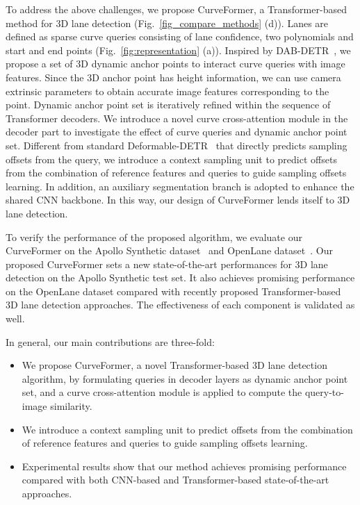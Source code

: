 \documentclass[letterpaper, 10 pt, conference]{ieeeconf}
\begin{document}
To address the above challenges, we propose CurveFormer, a Transformer-based method for 3D lane detection (Fig.~\ref{fig_compare_methods} (d)). Lanes are defined as sparse curve queries consisting of lane confidence, two polynomials and start and end points (Fig.~\ref{fig:representation} (a)). Inspired by DAB-DETR~\cite{liu2022dab}, we propose a set of 3D dynamic anchor points to interact curve queries with image features. Since the 3D anchor point  has height information, we can use camera extrinsic parameters to obtain accurate image features corresponding to the point. Dynamic anchor point set is iteratively refined within the sequence of Transformer decoders. We introduce a novel curve cross-attention module in the decoder part to investigate the effect of curve queries and dynamic anchor point set. Different from standard Deformable-DETR~\cite{zhu2020deformable } that directly predicts sampling offsets from the query, we introduce a context sampling unit to predict offsets from the combination of reference features and queries to guide sampling offsets learning. 
In addition, an auxiliary segmentation branch is adopted to enhance the shared CNN backbone. In this way, our design of CurveFormer lends itself to 3D lane detection.

To verify the performance of the proposed algorithm, we evaluate our CurveFormer on the Apollo Synthetic dataset~\cite{guo2020gen} and OpenLane dataset~\cite{chen2022persformer}. Our proposed CurveFormer sets a new state-of-the-art performances for 3D lane detection on the Apollo Synthetic test set. It also achieves promising performance on the OpenLane dataset compared with recently proposed Transformer-based 3D lane detection approaches. The effectiveness of each component is validated as well.

In general, our main contributions are three-fold:
\begin{itemize}
    \item We propose CurveFormer, a novel Transformer-based 3D lane detection algorithm, by formulating queries in decoder layers as dynamic anchor point set, and a curve cross-attention module is applied to compute the query-to-image similarity.
    
    \item We introduce a context sampling unit to predict offsets from the combination of reference features and queries to guide sampling offsets learning.
    
    \item Experimental results show that our method achieves promising performance compared with both CNN-based and Transformer-based state-of-the-art approaches.
\end{itemize}
\end{document}
